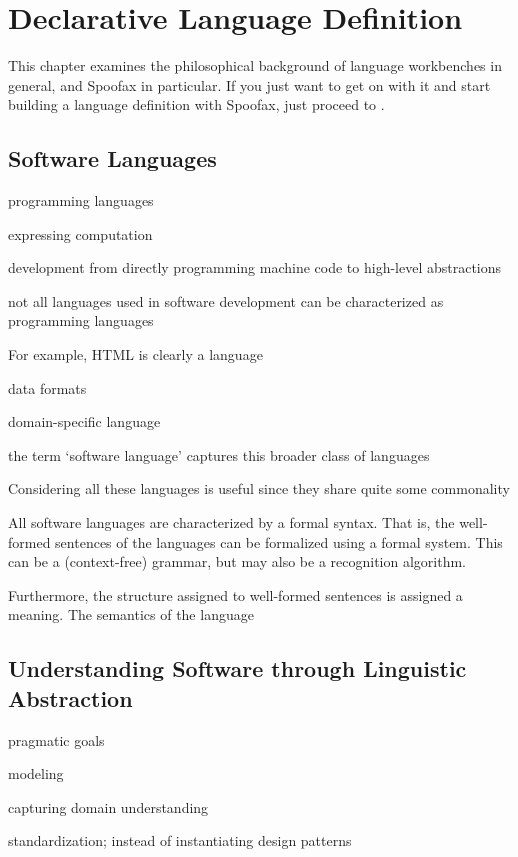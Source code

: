 \chapter{Declarative Language Definition}

This chapter examines the philosophical background of language workbenches in
general, and Spoofax in particular.
If you just want to get on with it and start building a
language definition with Spoofax, just proceed to .


\section{Software Languages}

programming languages

expressing computation

development from directly programming machine code to high-level abstractions

not all languages used in software development can be characterized as
programming languages

For example, HTML is clearly a language 

data formats

domain-specific language

the term `software language' captures this broader class of languages 

Considering all these languages is useful since they share quite some
commonality

All software languages are characterized by a formal syntax. That is, the
well-formed sentences of the languages can be formalized using a formal
system. This can be a (context-free) grammar, but may also be a recognition
algorithm.

Furthermore, the structure assigned to well-formed sentences is assigned a
meaning. The semantics of the language


\section{Understanding Software through Linguistic Abstraction}

\cite{Visser15}

pragmatic goals

modeling

capturing domain understanding

standardization; instead of instantiating design patterns

